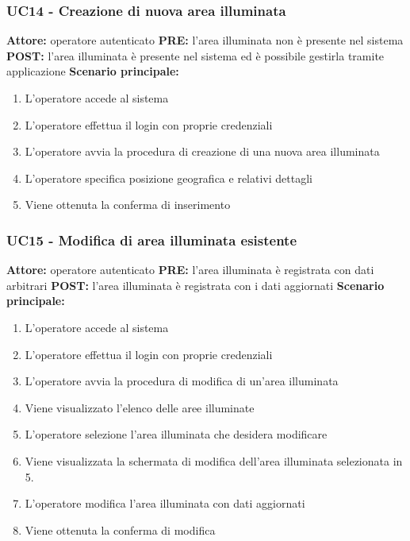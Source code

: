 \documentclass[a4paper, 12pt]{article}
\begin{document}
\subsubsection{UC14 - Creazione di nuova area illuminata}
\textbf{Attore:} operatore autenticato\newline
\textbf{PRE:} l'area illuminata non è presente nel sistema\newline
\textbf{POST:} l'area illuminata è presente nel sistema ed è possibile gestirla tramite applicazione\newline
\textbf{Scenario principale:}
\begin{enumerate}
    \item L'operatore accede al sistema
    \item L'operatore effettua il login con proprie credenziali
    \item L'operatore avvia la procedura di creazione di una nuova area illuminata
    \item L'operatore specifica posizione geografica e relativi dettagli
    \item Viene ottenuta la conferma di inserimento
\end{enumerate}

\subsubsection{UC15 - Modifica di area illuminata esistente}
\textbf{Attore:} operatore autenticato\newline
\textbf{PRE:} l'area illuminata è registrata con dati arbitrari\newline
\textbf{POST:} l'area illuminata è registrata con i dati aggiornati\newline
\textbf{Scenario principale:}
\begin{enumerate}
    \item L'operatore accede al sistema
    \item L'operatore effettua il login con proprie credenziali
    \item L'operatore avvia la procedura di modifica di un'area illuminata
    \item Viene visualizzato l'elenco delle aree illuminate
    \item L'operatore selezione l'area illuminata che desidera modificare
    \item Viene visualizzata la schermata di modifica dell'area illuminata selezionata in 5.
    \item L'operatore modifica l'area illuminata con dati aggiornati
    \item Viene ottenuta la conferma di modifica 
\end{enumerate}
\end{document}
